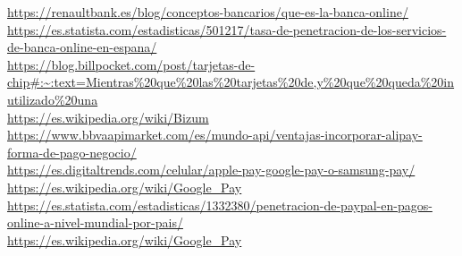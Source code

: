 

\url{https://renaultbank.es/blog/conceptos-bancarios/que-es-la-banca-online/}
\\
\url{https://es.statista.com/estadisticas/501217/tasa-de-penetracion-de-los-servicios-de-banca-online-en-espana/}
\\
\url{https://blog.billpocket.com/post/tarjetas-de-chip#:~:text=Mientras%20que%20las%20tarjetas%20de,y%20que%20queda%20inutilizado%20una}
\\
\url{https://es.wikipedia.org/wiki/Bizum}
\\
\url{https://www.bbvaapimarket.com/es/mundo-api/ventajas-incorporar-alipay-forma-de-pago-negocio/}
\\
\url{https://es.digitaltrends.com/celular/apple-pay-google-pay-o-samsung-pay/}
\\
\url{https://es.wikipedia.org/wiki/Google_Pay}
\\
\url{https://es.statista.com/estadisticas/1332380/penetracion-de-paypal-en-pagos-online-a-nivel-mundial-por-pais/}
\\
\url{https://es.wikipedia.org/wiki/Google_Pay}
